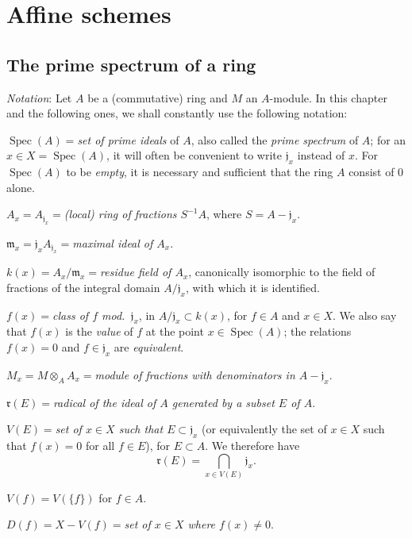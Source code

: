 \section{Affine schemes}
\label{section:I.1}

\setcounter{subsection}{0}
\subsection{The prime spectrum of a ring}
\label{subsection:I.1.1}

\begin{env}[1.1.1]
\label{I.1.1.1}
\emph{Notation}: Let $A$ be a (commutative) ring and $M$ an $A$-module. In
this chapter and the following ones, we shall constantly use the following
notation:

\smallskip
\noindent
$\operatorname{Spec}(A)={}$\emph{set of prime ideals} of $A$, also called
the \emph{prime spectrum} of $A$; for an
$x\in X=\operatorname{Spec}(A)$, it will often be convenient to write
$\mathfrak{j}_x$ instead of $x$. For $\operatorname{Spec}(A)$ to be
\emph{empty}, it is necessary and sufficient that the ring $A$ consist of
$0$ alone.

\smallskip
\noindent
$A_x=A_{\mathfrak{j}_x}={}$\emph{(local) ring of fractions $S^{-1}A$}, where
$S=A-\mathfrak{j}_x$.

\smallskip
\noindent
$\mathfrak{m}_x=\mathfrak{j}_xA_{\mathfrak{j}_x}={}$\emph{maximal ideal of
$A_x$}.

\smallskip
\noindent
$k(x)=A_x/\mathfrak{m}_x={}$\emph{residue field of $A_x$}, canonically
isomorphic to the field of fractions of the integral domain
$A/\mathfrak{j}_x$, with which it is identified.

\smallskip
\noindent
$f(x)={}$\emph{class of $f$ mod.~$\mathfrak{j}_x$}, in
$A/\mathfrak{j}_x\subset k(x)$, for $f\in A$ and $x\in X$. We also say that
$f(x)$ is the \emph{value} of $f$ at the point $x\in\operatorname{Spec}(A)$;
the relations $f(x)=0$ and $f\in\mathfrak{j}_x$ are \emph{equivalent}.

\smallskip
\noindent
$M_x=M\otimes_AA_x={}$\emph{module of fractions with denominators in
$A-\mathfrak{j}_x$}.

\smallskip
\noindent
$\mathfrak{r}(E)={}$\emph{radical of the ideal of $A$ generated by a subset
$E$ of $A$}.

\smallskip
\noindent
$V(E)={}$\emph{set of $x\in X$ such that $E\subset\mathfrak{j}_x$}
(or equivalently the set of $x\in X$ such that $f(x)=0$ for all $f\in E$),
for $E\subset A$. We therefore have
\begin{equation}
  \mathfrak{r}(E)=\bigcap_{x\in V(E)}\mathfrak{j}_x.
  \tag{1.1.1.1}\label{I.1.1.1.1}
\end{equation}

\smallskip
\noindent
$V(f)=V(\{f\})$ for $f\in A$.

\smallskip
\noindent
$D(f)=X-V(f)={}$\emph{set of $x\in X$ where $f(x)\neq0$}.
\end{env}

